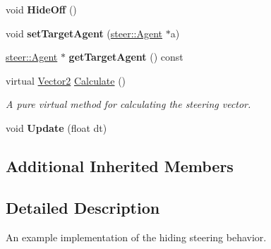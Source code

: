 \begin{DoxyCompactItemize}
\item 
\hypertarget{classsteer_1_1_hide_component_a94669d77ed55e882557720d1f7522a5c}{void {\bfseries Hide\-Off} ()}\label{classsteer_1_1_hide_component_a94669d77ed55e882557720d1f7522a5c}

\item 
\hypertarget{classsteer_1_1_hide_component_a0fc6f3c6b4eb749e4e88ced774f37c15}{void {\bfseries set\-Target\-Agent} (\hyperlink{classsteer_1_1_agent}{steer\-::\-Agent} $\ast$a)}\label{classsteer_1_1_hide_component_a0fc6f3c6b4eb749e4e88ced774f37c15}

\item 
\hypertarget{classsteer_1_1_hide_component_a529cb113ffc6a34f3d94e0f0d66ec42e}{\hyperlink{classsteer_1_1_agent}{steer\-::\-Agent} $\ast$ {\bfseries get\-Target\-Agent} () const }\label{classsteer_1_1_hide_component_a529cb113ffc6a34f3d94e0f0d66ec42e}

\item 
\hypertarget{classsteer_1_1_hide_component_aa52479885bacf5d24da8d480f2d7b2ff}{virtual \hyperlink{structsteer_1_1_vector2}{Vector2} \hyperlink{classsteer_1_1_hide_component_aa52479885bacf5d24da8d480f2d7b2ff}{Calculate} ()}\label{classsteer_1_1_hide_component_aa52479885bacf5d24da8d480f2d7b2ff}

\begin{DoxyCompactList}\small\item\em A pure virtual method for calculating the steering vector. \end{DoxyCompactList}\item 
\hypertarget{classsteer_1_1_hide_component_a7c07df9bbf52430c759683bc07e1e269}{void {\bfseries Update} (float dt)}\label{classsteer_1_1_hide_component_a7c07df9bbf52430c759683bc07e1e269}

\end{DoxyCompactItemize}
\subsection*{Additional Inherited Members}


\subsection{Detailed Description}
An example implementation of the hiding steering behavior. 

